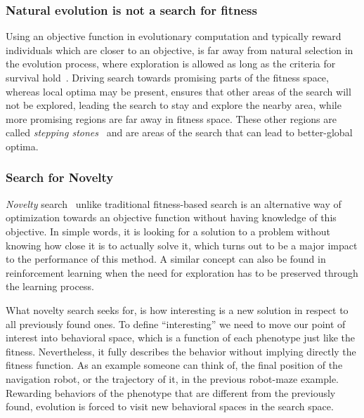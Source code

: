 \subsubsection*{Natural evolution is not a search for fitness}

Using an objective function in evolutionary computation and typically reward individuals which are closer to an objective, is far away from natural selection in the evolution process, where exploration is allowed as long as the criteria for survival hold~\cite{lehman2010revising}. Driving search towards promising parts of the fitness space, whereas local optima may be present, ensures that other areas of the search will not be explored, leading the search to stay and explore the nearby area, while more promising regions are far away in fitness space. These other regions are called \emph{stepping stones}~\cite{lehman2008exploiting,lehman2011abandoning,lehman2010revising,risi2009novelty} and are areas of the search that can lead to better-global optima.


\subsubsection*{Search for Novelty}

\emph{Novelty} search~\cite{lehman2008exploiting,lehman2011abandoning,lehman2010revising, risi2009novelty} unlike traditional fitness-based search is an alternative way of optimization towards an objective function without having knowledge of this objective. In simple words, it is looking for a solution to a problem without knowing how close it is to actually solve it, which turns out to be a major impact to the performance of this method. A similar concept can also be found in reinforcement learning when the need for exploration has to be preserved through the learning process.

What novelty search seeks for, is how interesting is a new solution in respect to all previously found ones. To define ``interesting'' we need to move our point of interest into behavioral space, which is a function of each phenotype just like the fitness. Nevertheless, it fully describes the behavior without implying directly the fitness function. As an example someone can think of, the final position of the navigation robot, or the trajectory of it, in the previous robot-maze example. Rewarding behaviors of the phenotype that are different from the previously found, evolution is forced to visit new behavioral spaces in the search space.

